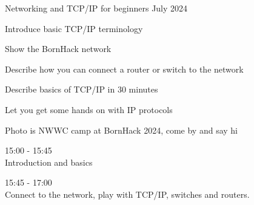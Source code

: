 \documentclass[Screen16to9,17pt]{foils}
\begin{document}





\mytitlepage
{Networking and TCP/IP for beginners}
{July 2024}


\hlkprofiluk



\begin{list2}
\item Introduce basic TCP/IP terminology
\item Show the BornHack network
\item Describe how you can connect a router or switch to the network
\item Describe basics of TCP/IP in 30 minutes
\item Let you get some hands on with IP protocols
\end{list2}

Photo is NWWC camp at BornHack 2024, come by and say hi



\begin{list2}
\item 15:00 - 15:45\\
Introduction and basics

\item 15:45 - 17:00\\
Connect to the network, play with TCP/IP, switches and routers.
\end{list2}
\end{document}
